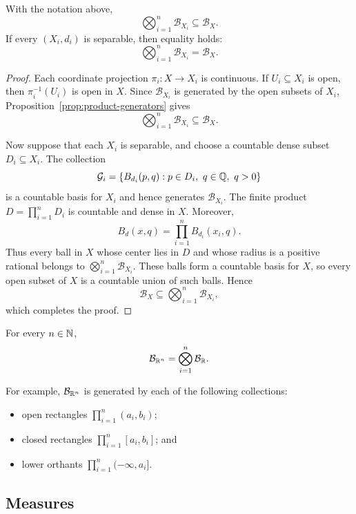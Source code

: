 \begin{proposition}\label{prop:product-borel-sigma-algebra}
  With the notation above,
  \[
    \bigotimes_{i=1}^n\mathcal B_{X_i}\subseteq\mathcal B_X.
  \]
  If every $(X_i,d_i)$ is separable, then equality holds:
  \[
    \bigotimes_{i=1}^n\mathcal B_{X_i}=\mathcal B_X.
  \]
\end{proposition}

\begin{proof}
  Each coordinate projection $\pi_i\colon X\to X_i$ is continuous. If
  $U_i\subseteq X_i$ is open, then $\pi_i^{-1}(U_i)$ is open in $X$.
  Since $\mathcal B_{X_i}$ is generated by the open subsets of $X_i$,
  Proposition~\ref{prop:product-generators} gives
  \[
    \bigotimes_{i=1}^n\mathcal B_{X_i}\subseteq\mathcal B_X.
  \]

  Now suppose that each $X_i$ is separable, and choose a countable dense
  subset $D_i\subseteq X_i$. The collection
  \[
    \mathcal G_i
    =\{B_{d_i}(p,q):p\in D_i,\ q\in\mathbb{Q},\ q>0\}
  \]
  is a countable basis for $X_i$ and hence generates
  $\mathcal B_{X_i}$. The finite product
  $D=\prod_{i=1}^nD_i$ is countable and dense in $X$. Moreover,
  \[
    B_d(x,q)=\prod_{i=1}^n B_{d_i}(x_i,q).
  \]
  Thus every ball in $X$ whose center lies in $D$ and whose radius is a
  positive rational belongs to
  $\bigotimes_{i=1}^n\mathcal B_{X_i}$. These balls form a countable
  basis for $X$, so every open subset of $X$ is a countable union of such
  balls. Hence
  \[
    \mathcal B_X\subseteq\bigotimes_{i=1}^n\mathcal B_{X_i},
  \]
  which completes the proof.
\end{proof}

\begin{corollary}
  For every $n\in\mathbb{N}$,
  \[
    \mathcal B_{\mathbb{R}^n}
    =\bigotimes_{i=1}^n\mathcal B_{\mathbb{R}}.
  \]
\end{corollary}

For example, $\mathcal B_{\mathbb{R}^n}$ is generated by each of the
following collections:
\begin{itemize}
  \item open rectangles $\prod_{i=1}^n(a_i,b_i)$;
  \item closed rectangles $\prod_{i=1}^n[a_i,b_i]$; and
  \item lower orthants $\prod_{i=1}^n(-\infty,a_i]$.
\end{itemize}

\subsection{Measures}

